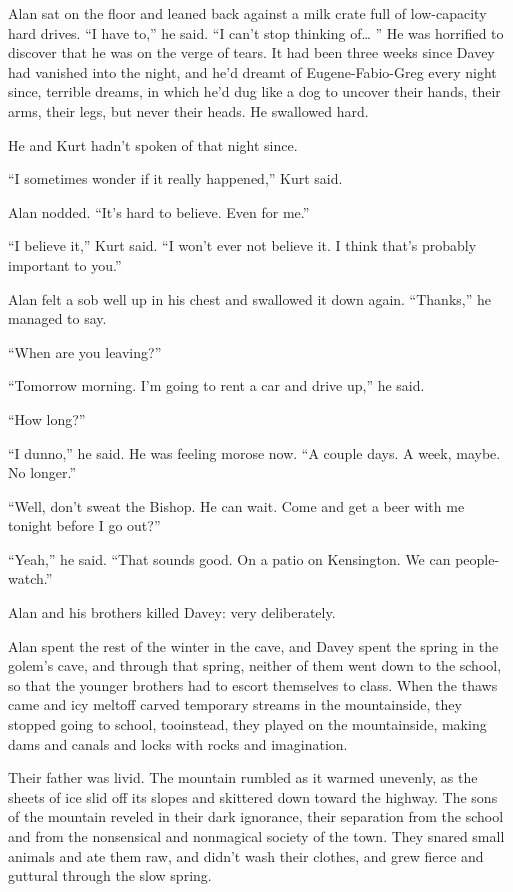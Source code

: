 Alan sat on the floor and leaned back against a milk crate full of
low-capacity hard drives.  ``I have to,'' he said.  ``I can't stop
thinking of\ldots{}  '' He was horrified to discover that he was on the
verge of tears.  It had been three weeks since Davey had vanished into
the night, and he'd dreamt of Eugene-Fabio-Greg every night since,
terrible dreams, in which he'd dug like a dog to uncover their hands,
their arms, their legs, but never their heads.  He swallowed hard.

He and Kurt hadn't spoken of that night since.

``I sometimes wonder if it really happened,'' Kurt said.

Alan nodded.  ``It's hard to believe.  Even for me.''

``I believe it,'' Kurt said.  ``I won't ever not believe it.  I think
that's probably important to you.''

Alan felt a sob well up in his chest and swallowed it down again. 
``Thanks,'' he managed to say.

``When are you leaving?''

``Tomorrow morning.  I'm going to rent a car and drive up,'' he said.

``How long?''

``I dunno,'' he said.  He was feeling morose now.  ``A couple days.  A
week, maybe.  No longer.''

``Well, don't sweat the Bishop.  He can wait.  Come and get a beer
with me tonight before I go out?''

``Yeah,'' he said.  ``That sounds good.  On a patio on Kensington.  We
can people-watch.''

 Alan and his brothers killed Davey:  very deliberately.

Alan spent the rest of the winter in the cave, and Davey spent the
spring in the golem's cave, and through that spring, neither of them
went down to the school, so that the younger brothers had to escort
themselves to class.  When the thaws came and icy meltoff carved
temporary streams in the mountainside, they stopped going to school,
too\dash{}instead, they played on the mountainside, making dams and canals
and locks with rocks and imagination.

Their father was livid.  The mountain rumbled as it warmed unevenly,
as the sheets of ice slid off its slopes and skittered down toward the
highway.  The sons of the mountain reveled in their dark ignorance,
their separation from the school and from the nonsensical and
nonmagical society of the town.  They snared small animals and ate
them raw, and didn't wash their clothes, and grew fierce and guttural
through the slow spring.

